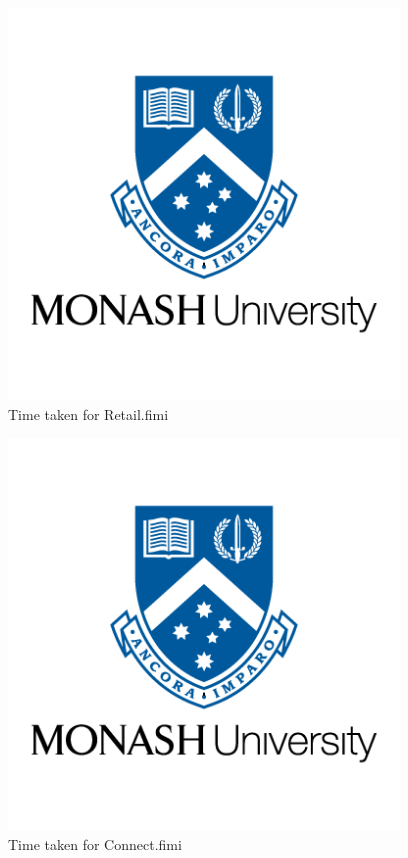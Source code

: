 \documentclass[10pt,a4paper]{article}
\begin{document}
\vspace{2cm}

\begin{figure}[h!]
\begin{center}
  \includegraphics[width=28em]{monash-university-logo.png}
\end{center}
  \caption{Time taken for Retail.fimi}
  \label{fig:SSPresults1}
\end{figure}

\vspace{2cm}

\begin{figure}[h!]
\begin{center}
  \includegraphics[width=28em]{monash-university-logo.png}
\end{center}
  \caption{Time taken for Connect.fimi}
  \label{fig:SSPresults1}
\end{figure}
\end{document}
